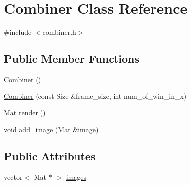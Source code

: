 \hypertarget{class_combiner}{
\section{Combiner Class Reference}
\label{class_combiner}
}


{\ttfamily \#include $<$combiner.h$>$}

\subsection*{Public Member Functions}
\begin{DoxyCompactItemize}
\item 
\hyperlink{class_combiner_a5f9877ee5f2f9bc6729afd5f11ac569c}{Combiner} ()
\item 
\hyperlink{class_combiner_a3d60ff2e7b79eb103d78d416131fa07b}{Combiner} (const Size \&frame\_\-size, int num\_\-of\_\-win\_\-in\_\-x)
\item 
Mat \hyperlink{class_combiner_aee8b8d179fbdccb013abf4b244d51e7e}{render} ()
\item 
void \hyperlink{class_combiner_a40ddc10da1134e1e003cf6ddf46da8b9}{add\_\-image} (Mat \&image)
\end{DoxyCompactItemize}
\subsection*{Public Attributes}
\begin{DoxyCompactItemize}
\item 
vector$<$ Mat $\ast$ $>$ \hyperlink{class_combiner_abe68e0620c00e937b066a11ed3ce51dc}{images}
\end{DoxyCompactItemize}


